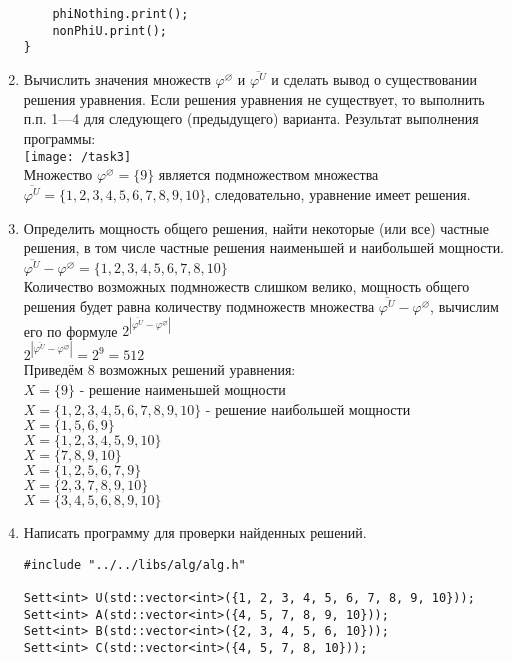 \documentclass[a4paper,14pt]{extarticle}
\begin{document}
\begin{enumerate}[№1. ]
\begin{verbatim}
	phiNothing.print();
	nonPhiU.print();
}
\end{verbatim}
\item Вычислить значения множеств $\varphi ^ \varnothing$ и $\overline{\varphi ^ U}$ и сделать вывод о существовании решения уравнения. Если решения уравнения не существует, то выполнить п.п. 1—4 для следующего (предыдущего) варианта.\bigbreak
Результат выполнения программы:\\
\texttt{[image: /task3]}\\
Множество $\varphi ^ \varnothing = \{9\}$ является подмножеством множества\\ $\overline{\varphi ^ U} = \{1, 2, 3, 4, 5, 6, 7, 8, 9, 10\}$, следовательно, уравнение имеет решения.
\item Определить мощность общего решения, найти некоторые (или все) частные решения, в том числе частные решения наименьшей и наибольшей мощности.\bigbreak
$\overline{\varphi ^ U} - \varphi ^ \varnothing  = \{1, 2, 3, 4, 5, 6, 7, 8, 10\}$\\
Количество возможных подмножеств слишком велико, мощность общего решения будет равна количеству подмножеств множества $\overline{\varphi ^ U} - \varphi ^ \varnothing$, вычислим его по формуле $2^{|\overline{\varphi ^ U} - \varphi ^ \varnothing|}$\\
$2^{|\overline{\varphi ^ U} - \varphi ^ \varnothing|} = 2^9 = 512$\\
Приведём 8 возможных решений уравнения:\\
$X=\{9\}$ - решение наименьшей мощности\\
$X=\{1, 2, 3, 4, 5, 6, 7, 8, 9, 10\}$ - решение наибольшей мощности\\
$X=\{1, 5, 6, 9\}$\\
$X=\{1, 2, 3, 4, 5, 9, 10\}$\\
$X=\{7, 8, 9, 10\}$\\
$X=\{1, 2, 5, 6, 7, 9\}$\\
$X=\{2, 3, 7, 8, 9, 10\}$\\
$X=\{3, 4, 5, 6, 8, 9, 10\}$\\
\item Написать программу для проверки найденных решений.
\begin{verbatim}
#include "../../libs/alg/alg.h"

Sett<int> U(std::vector<int>({1, 2, 3, 4, 5, 6, 7, 8, 9, 10}));
Sett<int> A(std::vector<int>({4, 5, 7, 8, 9, 10}));
Sett<int> B(std::vector<int>({2, 3, 4, 5, 6, 10}));
Sett<int> C(std::vector<int>({4, 5, 7, 8, 10}));


\end{verbatim}
\end{enumerate}
\end{document}
